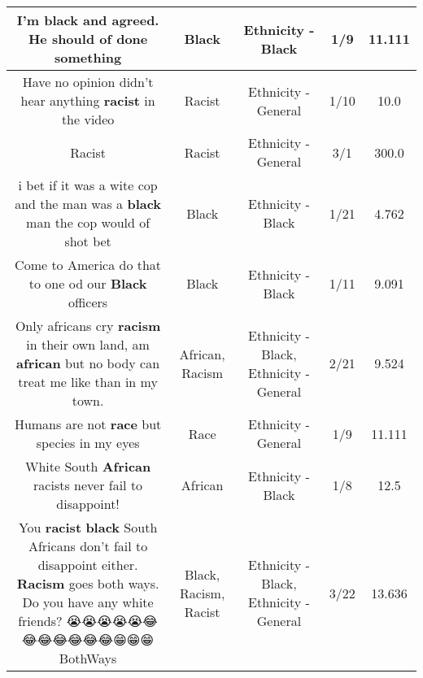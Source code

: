 \documentclass[11pt]{article}
\newlength\mylength
\begin{document}
\begin{center}
\begin{longtable}{|C{.65\mylength}|C{.30\mylength}|C{.12\mylength}|C{.12\mylength}|C{.12\mylength}|}
  \small I'm \textbf{black} and agreed. He should of done something\normalsize   & Black & Ethnicity - Black & 1/9 & 11.111 \\  \hline
  \small Have no opinion didn't hear anything \textbf{racist} in the video\normalsize   & Racist & Ethnicity - General & 1/10 & 10.0 \\  \hline
  \small Racist\normalsize   & Racist & Ethnicity - General & 3/1 & 300.0 \\  \hline
  \small i bet if it was a wite cop and the man was a \textbf{black} man the cop would of shot bet\normalsize   & Black & Ethnicity - Black & 1/21 & 4.762 \\  \hline
  \small Come to America do that to one od our \textbf{Black} officers\normalsize   & Black & Ethnicity - Black & 1/11 & 9.091 \\  \hline
  \small Only africans cry \textbf{racism} in their own land, am \textbf{african} but no body can treat me like than in my town.\normalsize   & African, Racism & Ethnicity - Black, Ethnicity - General & 2/21 & 9.524 \\  \hline
  \small Humans are not \textbf{race} but species in my eyes\normalsize   & Race & Ethnicity - General & 1/9 & 11.111 \\  \hline
  \small White South \textbf{African} racists never fail to disappoint!\normalsize   & African & Ethnicity - Black & 1/8 & 12.5 \\  \hline
  \small You \textbf{racist} \textbf{black} South Africans don't fail to disappoint either. \textbf{Racism} goes both ways. Do you have any white friends? 😭😭😭😭😭😂😂😂😂😂😂😂😁😁😁BothWays\normalsize   & Black, Racism, Racist & Ethnicity - Black, Ethnicity - General & 3/22 & 13.636 \\  \hline

\end{longtable}
\end{center}
\end{document}
